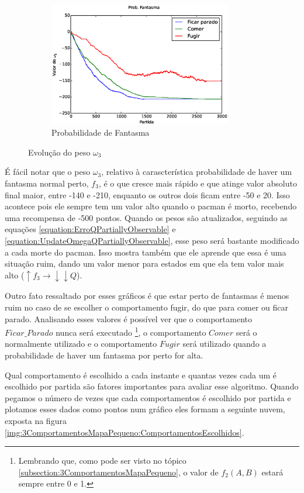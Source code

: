 \begin{figure}[H]
	\centering
	\begin{subfigure}[t]{.5\textwidth}
		\centering
		\includegraphics[width=80mm]{images/3_behaviors_small_map/weights____pol__ProbFantasma}
		\caption{Probabilidade de Fantasma}
	\end{subfigure}
	\caption{Evolução do peso $ \omega_3 $}
	\label{img:3ComportamentosMapaPequeno:PesoProbFantasma}
\end{figure}

É fácil notar que o peso $ \omega_3 $, relativo à carascterística probabilidade de haver um fantasma normal perto, $ f_3 $, é o que cresce mais rápido e que atinge valor absoluto final maior, entre -140 e -210, enquanto os outros dois ficam entre -50 e 20. Isso acontece pois ele sempre tem um valor alto quando o pacman é morto, recebendo uma recompensa de -500 pontos. Quando os pesos são atualizados, seguindo as equações \ref{equation:ErroQPartiallyObservable} e \ref{equation:UpdateOmegaQPartiallyObservable}, esse peso será bastante modificado a cada morte do pacman. Isso mostra também que ele aprende que essa é uma situação ruim, dando um valor menor para estados em que ela tem valor mais alto ($ \uparrow f_3 \rightarrow \downarrow \downarrow Q $).

Outro fato ressaltado por esses gráficos é que estar perto de fantasmas é menos ruim no caso de se escolher o comportamento fugir, do que para comer ou ficar parado. Analisando esses valores é possível ver que o comportamento $ Ficar\_Parado $ nunca será executado%
\footnote{Lembrando que, como pode ser visto no tópico \ref{subsection:3ComportamentosMapaPequeno}, o valor de $ f_2 \left( A, B \right) $ estará sempre entre 0 e 1.%
}, o comportamento $ Comer $ será o normalmente utilizado e o comportamento $ Fugir $ será utilizado quando a probabilidade de haver um fantasma por perto for alta.

Qual comportamento é escolhido a cada instante e quantas vezes cada um é escolhido por partida são fatores importantes para avaliar esse algoritmo. Quando pegamos o número de vezes que cada comportamentos é escolhido por partida e plotamos esses dados como pontos num gráfico eles formam a seguinte nuvem, exposta na figura \ref{img:3ComportamentosMapaPequeno:ComportamentosEscolhidos}.

